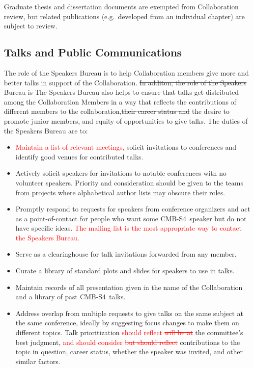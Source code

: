 \documentclass[12pt]{article}
\newcommand{\Comment}[1]{\textcolor{Blue}{(Comment: #1)}}
\newcommand\collabname{CMB-S4}
\newcommand{\revision}[1]{\textcolor{Red}{#1}}
\newcommand{\revtwo}[1]{\textcolor{Emerald}{#1}}
\begin{document}
Graduate thesis and dissertation documents are exempted from Collaboration review, but related publications (e.g.~developed from an individual chapter) are subject to review.

\subsection{Talks and Public Communications}

The role of the Speakers Bureau is to help Collaboration members give more and better talks in support of the Collaboration. \revtwo{\sout{In additon, the role of the Speakers Bureau is} The Speakers Bureau also helps} to ensure that talks get distributed among the Collaboration Members in a way that reflects the contributions of different members to the collaboration,\revtwo{\sout{their career status and}} the desire to promote junior members, and equity of opportunities to give talks. The duties of the Speakers Bureau are to:
\begin{itemize}
\item \revision{Maintain a list of relevant meetings,} solicit invitations to conferences and identify good venues for contributed talks.
\item Actively solicit speakers for invitations to notable conferences with no volunteer speakers. Priority and consideration should be given to the teams from projects where alphabetical author lists may obscure their roles. 
\item Promptly respond to requests for speakers from conference organizers and act as a point-of-contact for people who want some \collabname\ speaker but do not have specific ideas. \revision{The mailing list is the most appropriate way to contact the Speakers Bureau.}
\item Serve as a clearinghouse for talk invitations forwarded from any member.
\item Curate a library of standard plots and slides for speakers to use in talks.
\item Maintain records of all presentation given in the name of the Collaboration and a library of past \collabname\  talks.
\item Address overlap from multiple requests to give talks on the same subject at the same conference, ideally by suggesting focus changes to make them on different topics. Talk prioritization \revision{should reflect} \revision{\sout{will be at}} the committee's best judgment, \revision{and should consider} \revision{\sout{but should reflect}} contributions to the topic in question, career status, whether the speaker was invited, and other similar factors.
\end{itemize}
\end{document}
